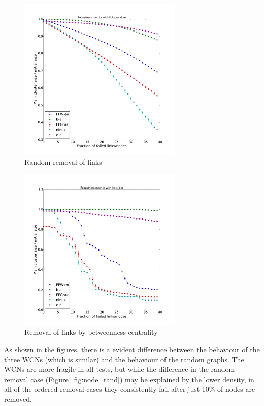 \documentclass[a4paper,11pt,twoside,openright]{memoir}
\newcommand{\figref}[1] {Figure~\ref{#1}}
\begin{document}
\begin{figure}[htbp]
\centering
\includegraphics[width=0.7\textwidth]{graphs/links_random_robustness}
\caption{Random removal of links}
\label{fig:link_rand}
\end{figure}

\begin{figure}[htbp]
\centering
\includegraphics[width=0.7\textwidth]{graphs/links_bet_robustness}
\caption{Removal of links by betweenness centrality}
\label{fig:link_bet}
\end{figure}

As shown in the figures, there is a evident difference between the
behaviour of the three WCNs (which is similar) and the behaviour of the
random graphs. The WCNs are more fragile in all tests, but while the
difference in the random removal case (\figref{fig:node_rand}) may be
explained by the lower density, in all of the ordered removal cases they
consistently fail after just 10\% of nodes are removed.
\end{document}
